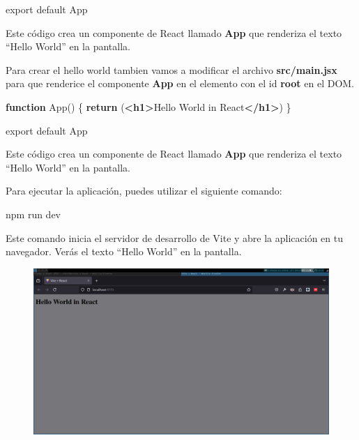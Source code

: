\documentclass[
  a4paper,
  DIV=11,
  numbers=noendperiod,
  onepage,
  openany]{scrreprt}
\newenvironment{Shaded}{\begin{snugshade}}{\end{snugshade}}
\newcommand{\ControlFlowTok}[1]{\textcolor[rgb]{0.00,0.23,0.31}{\textbf{#1}}}
\newcommand{\ExtensionTok}[1]{\textcolor[rgb]{0.00,0.23,0.31}{#1}}
\newcommand{\FunctionTok}[1]{\textcolor[rgb]{0.28,0.35,0.67}{#1}}
\newcommand{\ImportTok}[1]{\textcolor[rgb]{0.00,0.46,0.62}{#1}}
\newcommand{\KeywordTok}[1]{\textcolor[rgb]{0.00,0.23,0.31}{\textbf{#1}}}
\newcommand{\NormalTok}[1]{\textcolor[rgb]{0.00,0.23,0.31}{#1}}
\begin{document}
\begin{tcolorbox}
\begin{Shaded}
\begin{Highlighting}[]
\ImportTok{export} \ImportTok{default}\NormalTok{ App}
\end{Highlighting}
\end{Shaded}

Este código crea un componente de React llamado \textbf{App} que
renderiza el texto ``Hello World'' en la pantalla.

Para crear el hello world tambien vamos a modificar el archivo
\textbf{src/main.jsx} para que renderice el componente \textbf{App} en
el elemento con el id \textbf{root} en el DOM.

\begin{Shaded}
\begin{Highlighting}[]
\KeywordTok{function} \FunctionTok{App}\NormalTok{() \{}
  \ControlFlowTok{return}\NormalTok{ (}\KeywordTok{\textless{}h1\textgreater{}}\NormalTok{Hello World in React}\KeywordTok{\textless{}/h1\textgreater{}}\NormalTok{)}
\NormalTok{\}}

\ImportTok{export} \ImportTok{default}\NormalTok{ App}
\end{Highlighting}
\end{Shaded}

Este código crea un componente de React llamado \textbf{App} que
renderiza el texto ``Hello World'' en la pantalla.

Para ejecutar la aplicación, puedes utilizar el siguiente comando:

\begin{Shaded}
\begin{Highlighting}[]
\ExtensionTok{npm}\NormalTok{ run dev}
\end{Highlighting}
\end{Shaded}

Este comando inicia el servidor de desarrollo de Vite y abre la
aplicación en tu navegador. Verás el texto ``Hello World'' en la
pantalla.

\begin{figure}[H]

{\centering \includegraphics{images/react_hello_world.png}

}
\end{figure}
\end{tcolorbox}
\end{document}
